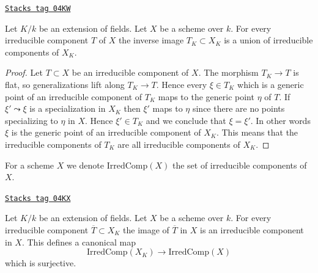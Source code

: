 \begin{lemma}
\label{varieties-lemma-inverse-image-irreducible}
\href{https://stacks.math.columbia.edu/tag/04KW}{\texttt{Stacks tag 04KW}}

Let $K/k$ be an extension of fields.
Let $X$ be a scheme over $k$.
For every irreducible component $T$ of $X$ the inverse image
$T_K \subset X_K$ is a union of irreducible components of $X_K$.
\end{lemma}

\begin{proof}
Let $T \subset X$ be an irreducible component of $X$.
The morphism $T_K \to T$ is flat, so generalizations lift
along $T_K \to T$. Hence every $\xi \in T_K$
which is a generic point of an irreducible component of $T_K$
maps to the generic point $\eta$ of $T$. If $\xi' \leadsto \xi$ is
a specialization in $X_K$ then $\xi'$ maps to $\eta$ since there
are no points specializing to $\eta$ in $X$. Hence $\xi' \in T_K$
and we conclude that $\xi = \xi'$. In other words $\xi$ is the
generic point of an irreducible component of $X_K$. This
means that the irreducible components of $T_K$ are all irreducible
components of $X_K$.
\end{proof}

For a scheme $X$ we denote $\text{IrredComp}(X)$ the set of
irreducible components of $X$.

\begin{lemma}
\label{varieties-lemma-image-irreducible}
\href{https://stacks.math.columbia.edu/tag/04KX}{\texttt{Stacks tag 04KX}}

Let $K/k$ be an extension of fields.
Let $X$ be a scheme over $k$.
For every irreducible component $\overline{T} \subset X_K$
the image of $\overline{T}$ in $X$ is an irreducible component in $X$.
This defines a canonical map
$$
\text{IrredComp}(X_K)
\longrightarrow
\text{IrredComp}(X)
$$
which is surjective.
\end{lemma}

